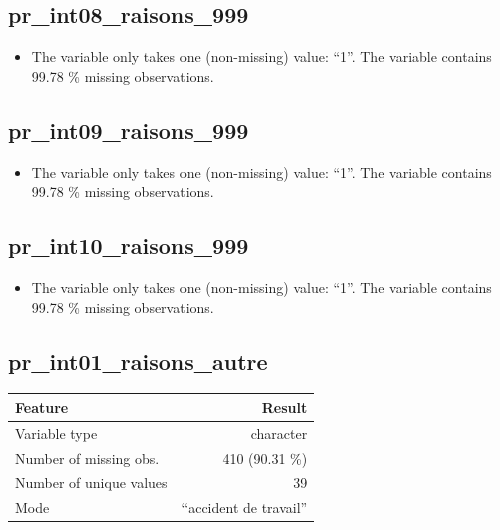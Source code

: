 \documentclass[
  letterpaper,
  DIV=11,
  numbers=noendperiod]{scrartcl}
\providecommand{\tightlist}{%
  \setlength{\itemsep}{0pt}\setlength{\parskip}{0pt}}
\begin{document}
\fullline

\subsection{pr\_int08\_raisons\_999}\label{pr_int08_raisons_999}

\begin{itemize}
\tightlist
\item
  The variable only takes one (non-missing) value: ``1''. The variable
  contains 99.78 \% missing observations.
\end{itemize}

\fullline

\subsection{pr\_int09\_raisons\_999}\label{pr_int09_raisons_999}

\begin{itemize}
\tightlist
\item
  The variable only takes one (non-missing) value: ``1''. The variable
  contains 99.78 \% missing observations.
\end{itemize}

\fullline

\subsection{pr\_int10\_raisons\_999}\label{pr_int10_raisons_999}

\begin{itemize}
\tightlist
\item
  The variable only takes one (non-missing) value: ``1''. The variable
  contains 99.78 \% missing observations.
\end{itemize}

\fullline

\subsection{pr\_int01\_raisons\_autre}\label{pr_int01_raisons_autre}

\bminione

\begin{longtable}[]{@{}lr@{}}
\toprule\noalign{}
Feature & Result \\
\midrule\noalign{}
\endhead
\bottomrule\noalign{}
\endlastfoot
Variable type & character \\
Number of missing obs. & 410 (90.31 \%) \\
Number of unique values & 39 \\
Mode & ``accident de travail'' \\
\end{longtable}
\end{document}
